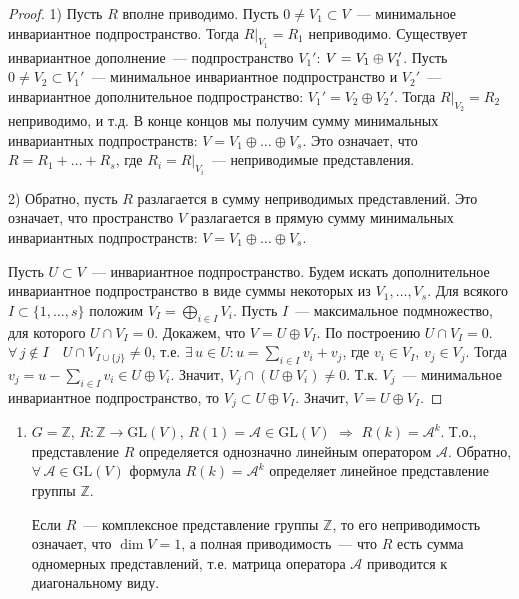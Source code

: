 \documentclass[a4paper]{article}
\newcommand*{\p}[1]{#1\nobreak\discretionary{}{\hbox{$\mathsurround=0pt #1$}}{}}
\begin{document}
\begin{proof}
1) Пусть $R$ вполне приводимо. Пусть $0\neq V_1\subset V$~---
минимальное инвариантное подпространство. Тогда $R|_{V_1}=R_1$
неприводимо. Существует инвариантное дополнение~--- подпространство
$V_1'$: $V\p=V_1\oplus V_1'$. Пусть $0\neq V_2\subset V_1'$~---
минимальное инвариантное подпространство и $V_2'$~--- инвариантное
дополнительное подпространство: $V_1'=V_2\oplus V_2'$. Тогда
$R|_{V_2}=R_2$ неприводимо, и т.д. В конце концов мы получим сумму
минимальных инвариантных подпространств: $V=V_1\oplus\ldots\oplus
V_s$. Это означает, что $R=R_1+\ldots+R_s$, где $R_i=R|_{V_i}$~---
неприводимые представления.

2) Обратно, пусть $R$ разлагается в сумму неприводимых
представлений. Это означает, что пространство $V$ разлагается в
прямую сумму минимальных инвариантных подпространств:
$V=V_1\oplus\ldots\oplus V_s$.

Пусть $U\subset V$~--- инвариантное подпространство. Будем искать
дополнительное инвариантное подпространство в виде суммы некоторых
из $V_1,\ldots, V_s$. Для всякого $I\subset\{1,\ldots,s\}$ положим
$V_I=\bigoplus\limits_{i\in I}V_i$. Пусть $I$~--- максимальное
подмножество, для которого $U\cap V_I=0$. Докажем, что $V=U\oplus
V_I$. По построению $U\cap V_I=0$. $\forall \, j\not\in I\quad U\cap
V_{I\cup\{j\}}\neq 0$, т.е. $\exists \, u\in U: u=\sum\limits_{i\in
I}v_i+v_j$, где $v_i\in V_I$, $v_j\in V_j$. Тогда
$v_j=u-\sum\limits_{i\in I}v_i\in U\oplus V_i$. Значит, $V_j\cap
(U\oplus V_i)\neq 0$. Т.к. $V_j$~--- минимальное инвариантное
подпространство, то $V_j\subset U\oplus V_I$. Значит, $V=U\oplus
V_I$.
\end{proof}

\begin{ex}
\begin{enumerate}
  \item $G=\mathbb{Z}$, $R\colon \mathbb{Z}\to \mathrm{GL}(V)$, $R(1)=\mathcal{A}\in
  \mathrm{GL}(V)$ $\Rightarrow$ $R(k)=\mathcal{A}^k$. Т.о., представление $R$
  определяется однозначно линейным оператором $\mathcal{A}$.
  Обратно, $\forall \, \mathcal{A}\in \mathrm{GL}(V)$ формула
  $R(k)=\mathcal{A}^k$ определяет линейное представление группы
  $\mathbb{Z}$.

  Если $R$~--- комплексное представление группы $\mathbb{Z}$, то его
  неприводимость означает, что $\dim V=1$, а полная приводимость~---
  что $R$ есть сумма одномерных представлений, т.е. матрица
  оператора $\mathcal{A}$ приводится к диагональному виду.
\end{enumerate}
\end{ex}
\end{document}
